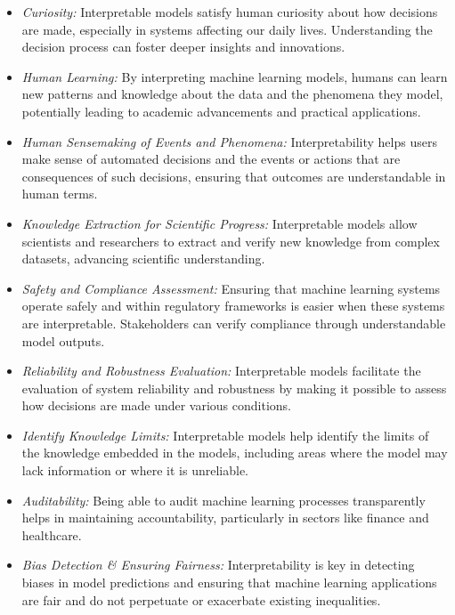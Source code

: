 \begin{itemize}
\item \emph{Curiosity:} Interpretable models satisfy human curiosity about how decisions are made, especially in systems affecting our daily lives. Understanding the decision process can foster deeper insights and innovations.

\item \emph{Human Learning:} By interpreting machine learning models, humans can learn new patterns and knowledge about the data and the phenomena they model, potentially leading to academic advancements and practical applications.

\item \emph{Human Sensemaking of Events and Phenomena:} Interpretability helps users make sense of automated decisions and the events or actions that are consequences of such decisions, ensuring that outcomes are understandable in human terms.

\item \emph{Knowledge Extraction for Scientific Progress:} Interpretable models allow scientists and researchers to extract and verify new knowledge from complex datasets, advancing scientific understanding.

\item \emph{Safety and Compliance Assessment:} Ensuring that machine learning systems operate safely and within regulatory frameworks is easier when these systems are interpretable. Stakeholders can verify compliance through understandable model outputs.

\item \emph{Reliability and Robustness Evaluation:} Interpretable models facilitate the evaluation of system reliability and robustness by making it possible to assess how decisions are made under various conditions.

\item \emph{Identify Knowledge Limits:} Interpretable models help identify the limits of the knowledge embedded in the models, including areas where the model may lack information or where it is unreliable.

\item \emph{Auditability:} Being able to audit machine learning processes transparently helps in maintaining accountability, particularly in sectors like finance and healthcare.

\item \emph{Bias Detection \& Ensuring Fairness:} Interpretability is key in detecting biases in model predictions and ensuring that machine learning applications are fair and do not perpetuate or exacerbate existing inequalities.


\end{itemize}
